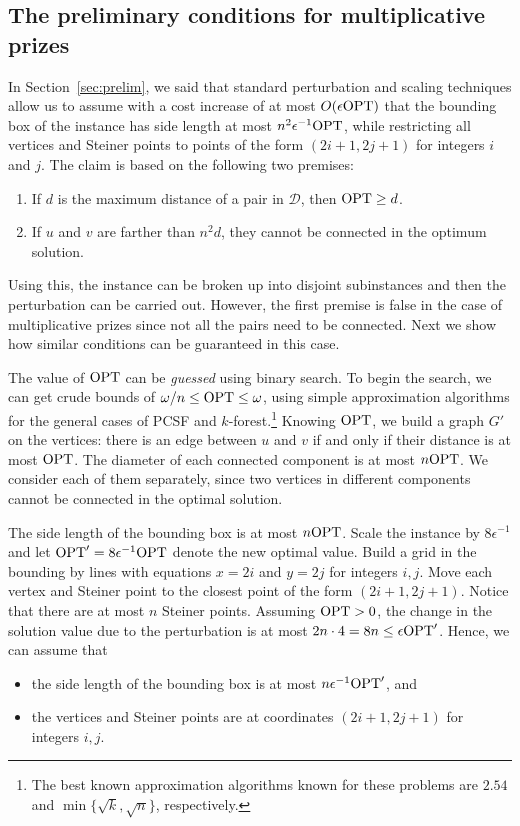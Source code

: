 \documentclass[extras,11pt]{article} \usepackage{fullpage}
\theoremstyle{mytheorem}
\newcommand{\eps}{\epsilon}
\newcommand{\DD}{\mathcal{D}}
\newcommand{\OPT}{\mbox{\rm OPT}}
\begin{document}
\subsection{The preliminary conditions for multiplicative prizes}\label{sec:prelim-mult}
In Section~\ref{sec:prelim}, we said that standard perturbation and scaling techniques allow us to assume
with a cost increase of at most $O(\eps\OPT)$
that the bounding box of the instance has side length at most $n^2\eps^{-1}\OPT$,
while restricting all vertices and Steiner points to points of the form $(2i+1,2j+1)$ for integers $i$ and $j$.
The claim is based on the following two premises:
\begin{enumerate}\setlength{\itemsep}{-.01in}
\item If $d$ is the maximum distance of a pair in $\DD$, then $\OPT \geq d$.
\item If $u$ and $v$
are farther than $n^2d$,
they cannot be connected in the optimum solution.
\end{enumerate}
Using this, the instance can be broken up into disjoint subinstances and then the perturbation can be carried out.
However, the first premise is false in the case of multiplicative prizes since not all the pairs need to be connected.
Next we show how similar conditions can be guaranteed in this case.

The value of $\OPT$ can be \emph{guessed} using binary search.
To begin the search, we can get crude bounds of $\omega/n \leq \OPT \leq \omega$,
using simple approximation algorithms for the general cases of PCSF and $k$-forest.\footnote{The best known approximation algorithms known for these problems are $2.54$ and $\min\{\sqrt k,\sqrt n\}$, respectively.}
Knowing $\OPT$, we build a graph $G'$ on the vertices:
there is an edge between $u$ and $v$ if and only if their distance is at most $\OPT$.
The diameter of each connected component is at most $n\OPT$.
We consider each of them separately, since two vertices in different components cannot be connected in the optimal solution.

The side length of the bounding box is at most $n\OPT$.
Scale the instance by $8\eps^{-1}$ and let $\OPT'=8\eps^{-1}\OPT$ denote the new optimal value.
Build a grid in the bounding by lines with equations $x=2i$ and $y=2j$ for integers $i,j$.
Move each vertex and Steiner point to the closest point of the form $(2i+1,2j+1)$.
Notice that there are at most $n$ Steiner points.
Assuming $\OPT>0$, the change in the solution value
due to the perturbation is at most $2n\cdot 4=8n\leq \eps\OPT'$.
Hence, we can assume that
\begin{itemize}\setlength{\itemsep}{-.01in}
\item the side length of the bounding box is at most $n\eps^{-1}\OPT'$, and
\item the vertices and Steiner points are at coordinates $(2i+1,2j+1)$ for integers $i,j$.
\end{itemize}
\end{document}
